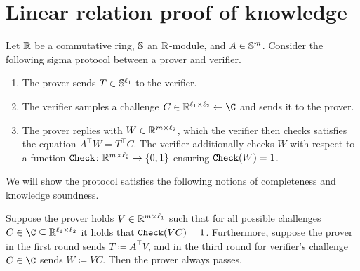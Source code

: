 
\begin{define}
    \newcommand\Sample{\mathtt{Sample}}
    \newcommand\Check{\mathtt{Check}}
    \newcommand\Clash{\mathtt{Clash}}
    \newcommand\ClashExt{\mathtt{ClashExt}}
    \newcommand\Valid{\mathtt{Valid}}
    \newcommand\G{\mathbb{G}}
    \newcommand\R{\mathbb{R}}
    \newcommand\S{\mathbb{S}}
\end{define}

\section{Linear relation proof of knowledge}

Let $\R$ be a commutative ring, $\S$ an $\R$-module, and $A\in\S^m$.
Consider the following sigma protocol between a prover and verifier.
\begin{enumerate}
    \item
    The prover sends $T\in\S^{\ell_1}$ to the verifier.

    \item
    The verifier samples a challenge $C\in\R^{\ell_1\times\ell_2}\leftarrow\C$ and sends it to the prover.

    \item
    The prover replies with $W\in\R^{m\times\ell_2}$, which the verifier then checks satisfies the equation $A^\intercal W=T^\intercal C$.
    The verifier additionally checks $W$ with respect to a function $\Check\colon\R^{m\times\ell_2}\to\{0,1\}$ ensuring $\Check(W)=1$.
\end{enumerate}

We will show the protocol satisfies the following notions of completeness and knowledge soundness.


Suppose the prover holds $V\in\R^{m\times\ell_1}$ such that for all possible challenges $C\in\C\subseteq\R^{\ell_1\times\ell_2}$ it holds that $\Check(VC)=1$.
Furthermore, suppose the prover in the first round sends $T\coloneq A^\intercal V$, and in the third round for verifier's challenge $C\in\C$ sends $W\coloneq VC$.
Then the prover always passes.



